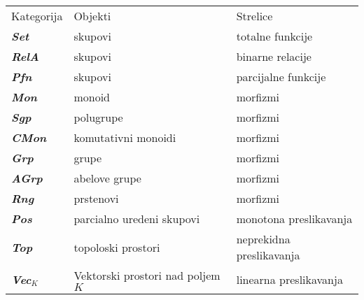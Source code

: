 \documentclass[11pt]{article}
\newcommand{\category}[1]{\textbf{\emph{#1}}}
\theoremstyle{definition}
\begin{document}
  \begin{center}
  \begin{longtabu}{l l l}  \vspace{1em}
    Kategorija & Objekti & Strelice \\
    \category{Set} & skupovi & totalne funkcije \\
    \category{RelA} & skupovi & binarne relacije \\
    \category{Pfn} & skupovi & parcijalne funkcije \\
    \category{Mon} & monoid & morfizmi \\
    \category{Sgp} & polugrupe & morfizmi \\
    \category{CMon} & komutativni monoidi & morfizmi \\
    \category{Grp} & grupe & morfizmi \\
    \category{AGrp} & abelove grupe & morfizmi \\
    \category{Rng} & prstenovi & morfizmi \\
    \category{Pos} & parcialno uredeni skupovi & monotona preslikavanja \\
    \category{Top} & topoloski prostori & neprekidna preslikavanja \\
    \category{Vec$_K$} & Vektorski prostori nad poljem $K$& linearna preslikavanja \\

    \end{longtabu}
  \end{center}
\end{document}
